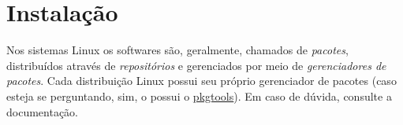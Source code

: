\chapter{Instalação}\label{chp:instalação}

Nos sistemas Linux os softwares são, geralmente, chamados de \textit{pacotes},
distribuídos através de \textit{repositórios} e gerenciados por meio de
\textit{gerenciadores de pacotes}. Cada distribuição Linux possui seu próprio
gerenciador de pacotes (caso esteja se perguntando, sim, o \slackwarelinux{}
possui o
\href{https://docs.slackware.com/slackware:package_management}{pkgtools}). Em
caso de dúvida, consulte a documentação.

